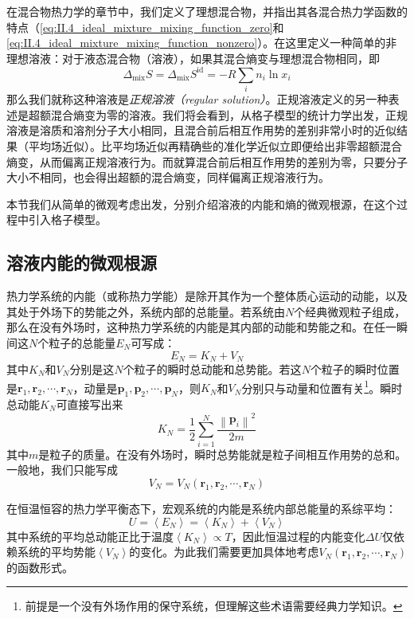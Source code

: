 \documentclass[main.tex]{subfiles}
\begin{document}
在混合物热力学的章节中，我们定义了理想混合物，并指出其各混合热力学函数的特点（\eqref{eq:II.4_ideal_mixture_mixing_function_zero}和\eqref{eq:II.4_ideal_mixture_mixing_function_nonzero}）。在这里定义一种简单的非理想溶液：对于液态混合物（溶液），如果其混合熵变与理想混合物相同，即
\[\Delta_\text{mix}S=\Delta_\text{mix}S^\text{id}=-R\sum_in_i\ln x_i\]
那么我们就称这种溶液是\emph{正规溶液（regular solution）}。正规溶液定义的另一种表述是超额混合熵变为零的溶液。我们将会看到，从格子模型的统计力学出发，正规溶液是溶质和溶剂分子大小相同，且混合前后相互作用势的差别非常小时的近似结果（平均场近似）。比平均场近似再精确些的准化学近似立即便给出非零超额混合熵变，从而偏离正规溶液行为。而就算混合前后相互作用势的差别为零，只要分子大小不相同，也会得出超额的混合熵变，同样偏离正规溶液行为。

本节我们从简单的微观考虑出发，分别介绍溶液的内能和熵的微观根源，在这个过程中引入格子模型。

\subsection{溶液内能的微观根源}\label{sec:III.1.1_internal_energy_micro_origin}
热力学系统的内能（或称热力学能）是除开其作为一个整体质心运动的动能，以及其处于外场下的势能之外，系统内部的总能量。若系统由$N$个经典微观粒子组成，那么在没有外场时，这种热力学系统的内能是其内部的动能和势能之和。在任一瞬间这$N$个粒子的总能量$E_N$可写成：
\[E_N=K_N+V_N\]
其中$K_N$和$V_N$分别是这$N$个粒子的瞬时总动能和总势能。若这$N$个粒子的瞬时位置是$\mathbf{r}_1,\mathbf{r}_2,\cdots,\mathbf{r}_N$，动量是$\mathbf{p}_1,\mathbf{p}_2,\cdots,\mathbf{p}_N$，则$K_N$和$V_N$分别只与动量和位置有关\footnote{前提是一个没有外场作用的保守系统，但理解这些术语需要经典力学知识。}。瞬时总动能$K_N$可直接写出来
\[K_N=\frac{1}{2}\sum_{i=1}^N\frac{\left\|\mathbf{p}_i\right\|^2}{2 m}\]
其中$m$是粒子的质量。在没有外场时，瞬时总势能就是粒子间相互作用势的总和。一般地，我们只能写成
\[V_N=V_N\left(\mathbf{r}_1,\mathbf{r}_2,\cdots,\mathbf{r}_N\right)\]

在恒温恒容的热力学平衡态下，宏观系统的内能是系统内部总能量的系综平均：
\[U=\left\langle E_N\right\rangle=\left\langle K_N\right\rangle+\left\langle V_N\right\rangle\]
其中系统的平均总动能正比于温度$\left\langle K_N\right\rangle\propto T$，因此恒温过程的内能变化$\Delta U$仅依赖系统的平均势能$\left\langle V_N\right\rangle$的变化。为此我们需要更加具体地考虑$V_N\left(\mathbf{r}_1,\mathbf{r}_2,\cdots,\mathbf{r}_N\right)$的函数形式。
\end{document}
